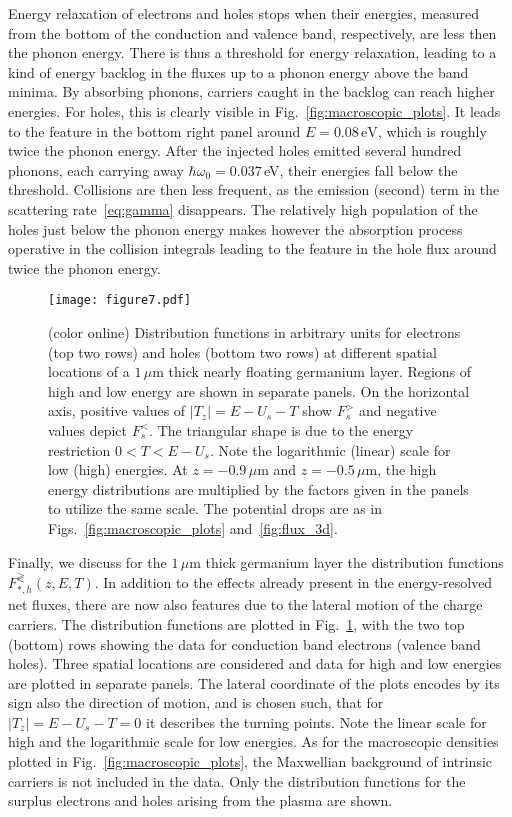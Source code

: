 \documentclass[pre,reprint,floats]{revtex4-1}
\begin{document}
Energy relaxation of electrons and holes stops when their energies, measured from the bottom of 
the conduction and valence band, respectively, are less then the phonon energy. There is thus a 
threshold for energy relaxation, leading to a kind of energy backlog in the fluxes up to a phonon 
energy above the band minima. By absorbing phonons, carriers caught in the backlog can reach higher 
energies. For holes, this is clearly visible in Fig.~\ref{fig:macroscopic_plots}. It leads to the 
feature in the bottom right panel around $E=0.08\,\mathrm{eV}$, which is 
roughly twice the phonon energy. After the injected holes emitted several hundred phonons, each 
carrying away $\hbar\omega_0=0.037\,$eV, their energies fall below the threshold. Collisions are 
then less frequent, as the emission (second) term in the scattering rate~\eqref{eq:gamma} disappears. 
The relatively high population of the holes just below the phonon energy makes however the absorption 
process operative in the collision integrals leading to the feature in the hole flux around 
twice the phonon energy. 

\begin{figure*}[t]
\texttt{[image: figure7.pdf]}
\caption{(color online) Distribution functions in arbitrary units for electrons (top two rows) and holes (bottom 
two rows) at different spatial locations of a $1\,\mu\mathrm{m}$ thick nearly floating germanium layer. Regions 
of high and low energy are shown in separate panels. On the horizontal axis, positive values of $|T_z|=E-U_s-T$ 
show $F^>_s$ and negative values depict $F_s^<$. The triangular shape is due to the energy restriction $0<T<E-U_s$. 
Note the logarithmic (linear) scale for low (high) energies. At $z=-0.9\,\mu$m and $z=-0.5\,\mu$m, the high energy 
distributions are multiplied by the factors given in the panels to utilize the same scale. 
The potential drops are as in Figs.~\ref{fig:macroscopic_plots} and~\ref{fig:flux_3d}.}
\label{fig:distributions}
\end{figure*}

Finally, we discuss for the $1\,\mu\mathrm{m}$ thick germanium layer the distribution functions
$F_{*,h}^\gtrless(z,E,T)$. In addition to the effects already present in the energy-resolved net fluxes,
there are now also features due to the lateral motion of the charge carriers. The distribution functions
are plotted in Fig.~\ref{fig:distributions}, with the two top (bottom) rows showing the data for conduction 
band electrons (valence band holes). Three spatial locations are considered and data for high and
low energies are plotted in separate panels. The lateral coordinate of the plots encodes by its sign 
also the direction of motion, and is chosen such, that for $|T_z|=E-U_s-T=0$ it describes the turning 
points. Note the linear scale for high and the logarithmic scale for low energies. As for the macroscopic 
densities plotted in Fig.~\ref{fig:macroscopic_plots}, the Maxwellian background of intrinsic carriers 
is not included in the data. Only the distribution functions for the surplus electrons and holes arising 
from the plasma are shown.
\end{document}
